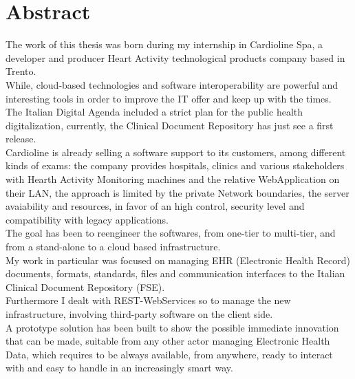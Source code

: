 \chapter*{Abstract} %
\label{abstract}

The work of this thesis was born during my internship in Cardioline Spa, a developer and producer Heart Activity technological products company based in Trento.\\While, cloud-based technologies and software interoperability are powerful and interesting tools in order to improve the IT offer and keep up with the times.\\The Italian Digital Agenda included a strict plan for the public health digitalization, currently, the Clinical Document Repository has just see a first release.\\Cardioline is already selling a software support to its customers, among different kinds of exams: the company provides hospitals, clinics and various stakeholders with Hearth Activity Monitoring machines and the relative WebApplication on their LAN, the approach is limited by the private Network boundaries, the server avaiability and resources, in favor of an high control, security level and compatibility with legacy applications.\\The goal has been to reengineer the softwares, from one-tier to multi-tier, and from a stand-alone to a cloud based infrastructure.\\My work in particular was focused on managing EHR (Electronic Health Record) documents, formats, standards, files and communication interfaces to the Italian Clinical Document Repository (FSE).\\Furthermore I dealt with REST-WebServices so to manage the new infrastructure, involving third-party software on the client side.\\A prototype solution has been built to show the possible immediate innovation that can be made, suitable from any other actor managing Electronic Health Data, which requires to be always available, from anywhere, ready to interact with and easy to handle in an increasingly smart way.
\vfill